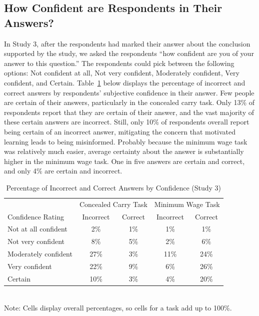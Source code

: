 \documentclass[12pt, letterpaper]{article}
\begin{document}
\clearpage
\subsection{How Confident are Respondents in Their Answers?}
\label{sec:confidence}

In Study 3, after the respondents had marked their answer about the conclusion supported by the study, we asked the respondents ``how confident are you of your answer to this question.'' The respondents could pick between the following options: Not confident at all, Not very confident, Moderately confident, Very confident, and Certain. Table~\ref{tab:confidence} below displays the percentage of incorrect and correct answers by respondents' subjective confidence in their answer. Few people are certain of their answers, particularly in the concealed carry task. Only 13\% of respondents report that they are certain of their answer, and the vast majority of these certain answers are incorrect. Still, only 10\% of respondents overall report being certain of an incorrect answer, mitigating the concern that motivated learning leads to being misinformed. Probably because the minimum wage task was relatively much easier, average certainty about the answer is substantially higher in the minimum wage task. One in five answers are certain and correct, and only 4\% are certain and incorrect.

\singlespacing
\begin{table}[h]
\centering
\caption {Percentage of Incorrect and Correct Answers by Confidence (Study 3)}
\label{tab:confidence}
\begin{tabular}{| l | c  c | c  c | }
\hline 
  & \multicolumn{2}{|c|}{Concealed Carry Task} & \multicolumn{2}{c|}{Minimum Wage Task} \\
Confidence Rating	& Incorrect & Correct  & Incorrect & Correct \\ \hline
Not at all confident	& 2\%	& 1\%	& 1\% 	& 1\% \\ 
Not very confident	& 8\%	& 5\%	& 2\% 	& 6\% \\ 
Moderately confident	& 27\%	& 3\%	& 11\% 	& 24\% \\ 
Very confident		& 22\%	& 9\%	& 6\% 	& 26\% \\ 
Certain			& 10\%	& 3\%	& 4\% 	& 20\% \\ \hline
\end{tabular}
\\Note: Cells display overall percentages, so cells for a task add up to 100\%.
\end{table}
\end{document}
